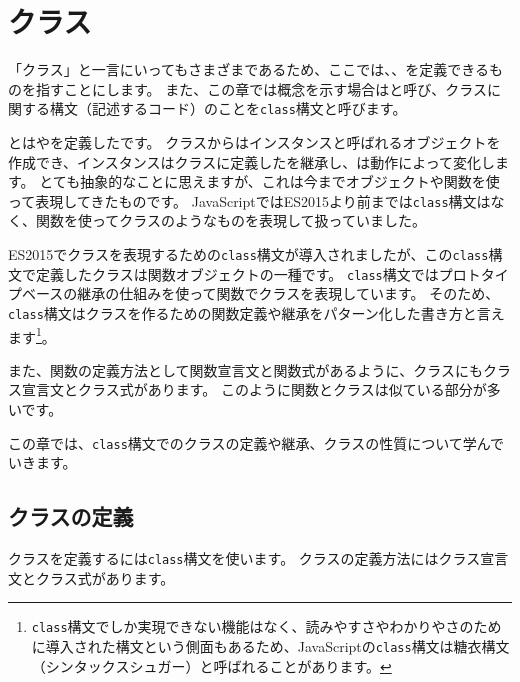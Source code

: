\hypertarget{class}{%
\chapter{クラス}\label{class}}
\thispagestyle{frontheadings}

「クラス」と一言にいってもさまざまであるため、ここでは\textbf{}、\textbf{}、\textbf{}を定義できるものを指すことにします。
また、この章では概念を示す場合は\textbf{}と呼び、クラスに関する構文（記述するコード）のことを\texttt{class}構文と呼びます。

\textbf{}とは\textbf{}や\textbf{}を定義した\textbf{}です。
クラスからはインスタンスと呼ばれるオブジェクトを作成でき、インスタンスはクラスに定義した\textbf{}を継承し、\textbf{}は動作によって変化します。
とても抽象的なことに思えますが、これは今までオブジェクトや関数を使って表現してきたものです。
JavaScriptではES2015より前までは\texttt{class}構文はなく、関数を使ってクラスのようなものを表現して扱っていました。

ES2015でクラスを表現するための\texttt{class}構文が導入されましたが、この\texttt{class}構文で定義したクラスは関数オブジェクトの一種です。
\texttt{class}構文ではプロトタイプベースの継承の仕組みを使って関数でクラスを表現しています。
そのため、\texttt{class}構文はクラスを作るための関数定義や継承をパターン化した書き方と言えます\footnote{\texttt{class}構文でしか実現できない機能はなく、読みやすさやわかりやさのために導入された構文という側面もあるため、JavaScriptの\texttt{class}構文は糖衣構文（シンタックスシュガー）と呼ばれることがあります。}。

また、関数の定義方法として関数宣言文と関数式があるように、クラスにもクラス宣言文とクラス式があります。
このように関数とクラスは似ている部分が多いです。

この章では、\texttt{class}構文でのクラスの定義や継承、クラスの性質について学んでいきます。

\hypertarget{class-declaration}{%
\section{クラスの定義}\label{class-declaration}}

クラスを定義するには\texttt{class}構文を使います。
クラスの定義方法にはクラス宣言文とクラス式があります。

